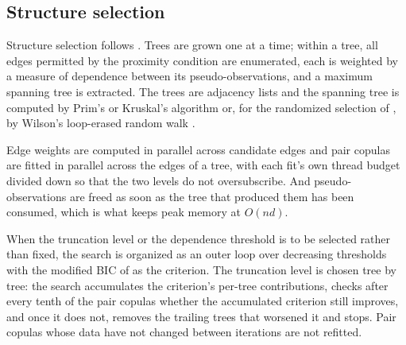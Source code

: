 \documentclass[article]{jss}
\begin{document}
\subsection{Structure selection}\label{sec:select-engine}

Structure selection follows \citet{dissmann2013}.  Trees are grown one at a
time; within a tree, all edges permitted by the proximity condition are
enumerated, each is weighted by a measure of dependence between its
pseudo-observations, and a maximum spanning tree is extracted.  The trees are
 adjacency lists \citep{siek2002} and the spanning tree is
computed by Prim's or Kruskal's algorithm or, for the randomized selection of
\citet{vatter2025}, by Wilson's loop-erased random walk \citep{wilson1996}.

Edge weights are computed in parallel across
candidate edges and pair copulas are fitted in parallel across the edges of a
tree, with each fit's own thread budget divided down so that the two levels do
not oversubscribe.  And pseudo-observations are freed as soon as the tree that
produced them has been consumed, which is what keeps peak memory at $O(nd)$.

When the truncation level or the dependence threshold is to be selected rather
than fixed, the search is organized as an outer loop over decreasing thresholds
with the modified BIC of \citet{nagler2019} as the criterion.  The truncation
level is chosen tree by tree: the search accumulates the criterion's per-tree
contributions, checks after every tenth of the pair copulas whether the
accumulated criterion still improves, and once it does not, removes the
trailing trees that worsened it and stops.  Pair copulas whose data have not changed between
iterations are not refitted.
\end{document}
